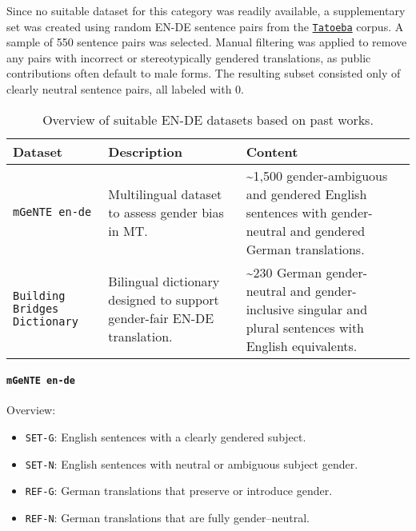 Since no suitable dataset for this category was readily available, a supplementary set was created using random EN-DE sentence pairs from the \href{https://tatoeba.org/en/}{\texttt{Tatoeba}} corpus. A sample of 550 sentence pairs was selected. Manual filtering was applied to remove any pairs with incorrect or stereotypically gendered translations, as public contributions often default to male forms. The resulting subset consisted only of clearly neutral sentence pairs, all labeled with 0.

\begin{table}[ht!]
    \centering
    \renewcommand{\arraystretch}{1.3}
    \begin{tabularx}{\textwidth}{|>{\raggedright\arraybackslash}X|>{\raggedright\arraybackslash}X|>{\raggedright\arraybackslash}X|}
    \hline
    \textbf{Dataset} & \textbf{Description} & \textbf{Content} \\ \hline
    \texttt{mGeNTE en-de} \citep{savoldiMGeNTEMultilingualResource2025} & Multilingual dataset to assess gender bias in MT. & \textasciitilde1,500 gender-ambiguous and gendered English sentences with gender-neutral and gendered German translations. \\ \hline
    \texttt{Building Bridges Dictionary} \citep{lardelliBuildingBridgesDataset2024} & Bilingual dictionary designed to support gender-fair EN-DE translation. & \textasciitilde230 German gender-neutral and gender-inclusive singular and plural sentences with English equivalents. \\ \hline
    \end{tabularx}
    \caption{Overview of suitable EN-DE datasets based on past works.}
    \label{tab:available_datasets}
\end{table}

\paragraph {\texttt{mGeNTE en-de}} Overview:  

\begin{itemize}  
  \item \texttt{SET-G}: English sentences with a clearly gendered subject.  
  \item \texttt{SET-N}: English sentences with neutral or ambiguous subject gender.  
  \item \texttt{REF-G}: German translations that preserve or introduce gender.  
  \item \texttt{REF-N}: German translations that are fully gender–neutral.  
\end{itemize}  

